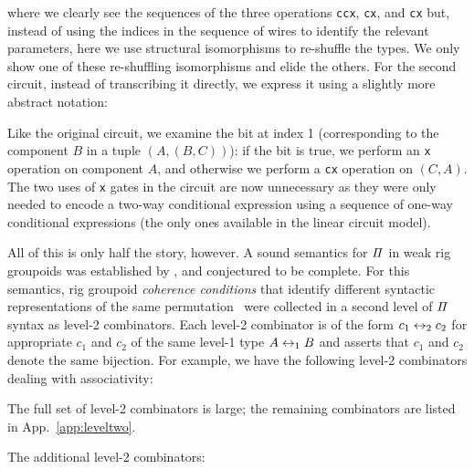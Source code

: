 \medskip

\adder{}

\addertwo{}

\noindent where we clearly see the sequences of the three operations \verb|ccx|, \verb|cx|, and \verb|cx| but, instead
of using the indices in the sequence of wires to identify the relevant parameters, here we use structural isomorphisms
to re-shuffle the types. We only show one of these re-shuffling isomorphisms and elide the others. For the second circuit, instead of transcribing it directly, we express it using
a slightly more abstract notation:

\medskip

\resettwo{}

\noindent Like the original circuit, we examine the bit at index 1 (corresponding to the component $B$ in a tuple
$(A,(B,C))$): if the bit is true, we perform an \verb|x| operation on component $A$, and otherwise we perform a
\verb|cx| operation on $(C,A)$. The two uses of \verb|x| gates in the circuit are now unnecessary as they were only needed
to encode a two-way conditional expression using a sequence of one-way conditional expressions (the only ones available in
the linear circuit model).

All of this is only half the story, however. A sound semantics for $\mathit{\Pi}$ in weak rig
groupoids was established by \citet{caretteComputingSemiringsWeak2016}, and conjectured to be complete. For this
semantics, rig groupoid \emph{coherence conditions} that identify different syntactic representations of the same
permutation~\cite{laplaza72,Carette2016} were collected  in a
second level of $\mathit{\Pi}$ syntax as level-2 combinators.  Each level-2 combinator is of the form $c_1 \leftrightarrow_2 c_2$ for appropriate
$c_1$ and $c_2$ of the same level-1 type $A \leftrightarrow_1 B$ and asserts that $c_1$ and $c_2$ denote the same bijection. For
example, we have the following level-2 combinators dealing with associativity:

\medskip

\leveltwoblockone{}

\noindent The full set of level-2 combinators is large; the remaining combinators are listed in App.~\ref{app:leveltwo}.

\begin{toappendix}
  \label{app:leveltwo}

  The additional level-2 combinators:

  \medskip
  \leveltwoblocktwo{}
\end{toappendix}


